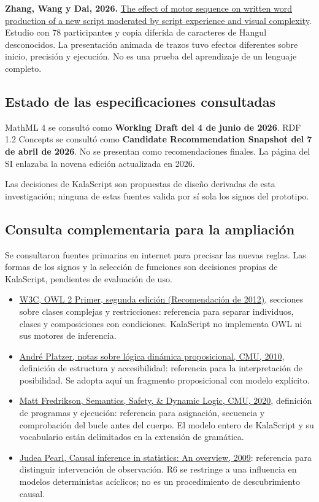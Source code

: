 \textbf{Zhang, Wang y Dai, 2026.} \href{https://link.springer.com/article/10.1007/s11145-026-10837-x}{The effect of motor sequence on written word production of a new script moderated by script experience and visual complexity}. Estudio con 78 participantes y copia diferida de caracteres de Hangul desconocidos. La presentación animada de trazos tuvo efectos diferentes sobre inicio, precisión y ejecución. No es una prueba del aprendizaje de un lenguaje completo.

\subsection{Estado de las especificaciones consultadas}

MathML 4 se consultó como \textbf{Working Draft del 4 de junio de 2026}. RDF 1.2 Concepts se consultó como \textbf{Candidate Recommendation Snapshot del 7 de abril de 2026}. No se presentan como recomendaciones finales. La página del SI enlazaba la novena edición actualizada en 2026.

Las decisiones de KalaScript son propuestas de diseño derivadas de esta investigación; ninguna de estas fuentes valida por sí sola los signos del prototipo.

\subsection{Consulta complementaria para la ampliación}
Se consultaron fuentes primarias en internet para precisar las nuevas reglas.
Las formas de los signos y la selección de funciones son decisiones propias de
KalaScript, pendientes de evaluación de uso.
\begin{itemize}
\item \href{https://www.w3.org/TR/owl2-primer/}{W3C, OWL 2 Primer, segunda edición
(Recomendación de 2012)}, secciones sobre clases complejas y restricciones:
referencia para separar individuos, clases y composiciones con condiciones.
KalaScript no implementa OWL ni sus motores de inferencia.
\item \href{https://www.cs.cmu.edu/~fp/courses/15816-s10/lectures/19-PDL.pdf}{André
Platzer, notas sobre lógica dinámica proposicional, CMU, 2010}, definición de
estructura y accesibilidad: referencia para la interpretación de posibilidad.
Se adopta aquí un fragmento proposicional con modelo explícito.
\item \href{https://15316-cmu.github.io/2020/lectures/03-safety.pdf}{Matt Fredrikson,
Semantics, Safety, \& Dynamic Logic, CMU, 2020}, definición de programas y
ejecución: referencia para asignación, secuencia y comprobación del bucle antes
del cuerpo. El modelo entero de KalaScript y su vocabulario están delimitados
en la extensión de gramática.
\item \href{https://ftp.cs.ucla.edu/pub/stat_ser/r350.pdf}{Judea Pearl, Causal
inference in statistics: An overview, 2009}: referencia para distinguir
intervención de observación. R6 se restringe a una influencia en modelos
deterministas acíclicos; no es un procedimiento de descubrimiento causal.
\end{itemize}
